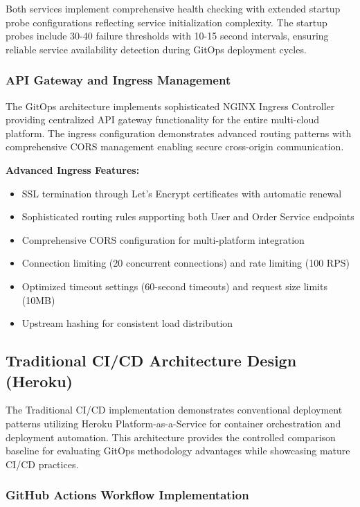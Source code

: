 Both services implement comprehensive health checking with extended startup probe configurations reflecting service initialization complexity. The startup probes include 30-40 failure thresholds with 10-15 second intervals, ensuring reliable service availability detection during GitOps deployment cycles.



\subsubsection{API Gateway and Ingress Management}

The GitOps architecture implements sophisticated NGINX Ingress Controller providing centralized API gateway functionality for the entire multi-cloud platform. The ingress configuration demonstrates advanced routing patterns with comprehensive CORS management enabling secure cross-origin communication.

\textbf{Advanced Ingress Features:}
\begin{itemize}
\item SSL termination through Let's Encrypt certificates with automatic renewal
\item Sophisticated routing rules supporting both User and Order Service endpoints
\item Comprehensive CORS configuration for multi-platform integration
\item Connection limiting (20 concurrent connections) and rate limiting (100 RPS)
\item Optimized timeout settings (60-second timeouts) and request size limits (10MB)
\item Upstream hashing for consistent load distribution
\end{itemize}

\subsection{Traditional CI/CD Architecture Design (Heroku)}

The Traditional CI/CD implementation demonstrates conventional deployment patterns utilizing Heroku Platform-as-a-Service for container orchestration and deployment automation. This architecture provides the controlled comparison baseline for evaluating GitOps methodology advantages while showcasing mature CI/CD practices.

\subsubsection{GitHub Actions Workflow Implementation}

